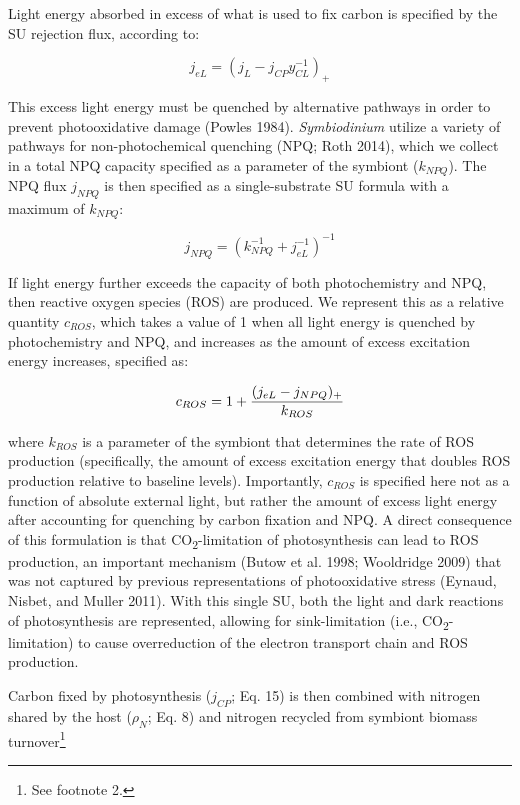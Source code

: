 \documentclass[]{elsarticle} %
\begin{document}
Light energy absorbed in excess of what is used to fix carbon is
specified by the SU rejection flux, according to:

\begin{equation} j_{eL} = (j_L - j_{CP}y_{CL}^{-1})_+ \end{equation}

This excess light energy must be quenched by alternative pathways in
order to prevent photooxidative damage (Powles 1984).
\emph{Symbiodinium} utilize a variety of pathways for non-photochemical
quenching (NPQ; Roth 2014), which we collect in a total NPQ capacity
specified as a parameter of the symbiont (\(k_{NPQ}\)). The NPQ flux
\(j_{NPQ}\) is then specified as a single-substrate SU formula with a
maximum of \(k_{NPQ}\):

\begin{equation} j_{NPQ} = (k_{NPQ}^{-1} + j_{eL}^{-1})^{-1} \end{equation}

If light energy further exceeds the capacity of both photochemistry and
NPQ, then reactive oxygen species (ROS) are produced. We represent this
as a relative quantity \(c_{ROS}\), which takes a value of 1 when all
light energy is quenched by photochemistry and NPQ, and increases as the
amount of excess excitation energy increases, specified as:

\begin{equation} c_{ROS} = 1 + {{(j_{eL} - j_{NPQ})_+} \over k_{ROS}} \end{equation}

where \(k_{ROS}\) is a parameter of the symbiont that determines the
rate of ROS production (specifically, the amount of excess excitation
energy that doubles ROS production relative to baseline levels).
Importantly, \(c_{ROS}\) is specified here not as a function of absolute
external light, but rather the amount of excess light energy after
accounting for quenching by carbon fixation and NPQ. A direct
consequence of this formulation is that CO\textsubscript{2}-limitation
of photosynthesis can lead to ROS production, an important mechanism
(Butow et al. 1998; Wooldridge 2009) that was not captured by previous
representations of photooxidative stress (Eynaud, Nisbet, and Muller
2011). With this single SU, both the light and dark reactions of
photosynthesis are represented, allowing for sink-limitation (i.e.,
CO\textsubscript{2}-limitation) to cause overreduction of the electron
transport chain and ROS production.

Carbon fixed by photosynthesis (\(j_{CP}\); Eq. 15) is then combined
with nitrogen shared by the host (\(\rho_N\); Eq. 8) and nitrogen
recycled from symbiont biomass turnover\footnote{See footnote 2.}
\end{document}
